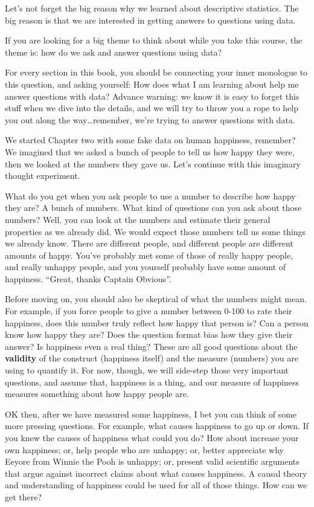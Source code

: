 \documentclass[
]{book}
\begin{document}
Let's not forget the big reason why we learned about descriptive statistics. The big reason is that we are interested in getting answers to questions using data.

If you are looking for a big theme to think about while you take this course, the theme is: how do we ask and answer questions using data?

For every section in this book, you should be connecting your inner monologue to this question, and asking yourself: How does what I am learning about help me answer questions with data? Advance warning: we know it is easy to forget this stuff when we dive into the details, and we will try to throw you a rope to help you out along the way\ldots remember, we're trying to answer questions with data.

We started Chapter two with some fake data on human happiness, remember? We imagined that we asked a bunch of people to tell us how happy they were, then we looked at the numbers they gave us. Let's continue with this imaginary thought experiment.

What do you get when you ask people to use a number to describe how happy they are? A bunch of numbers. What kind of questions can you ask about those numbers? Well, you can look at the numbers and estimate their general properties as we already did. We would expect those numbers tell us some things we already know. There are different people, and different people are different amounts of happy. You've probably met some of those of really happy people, and really unhappy people, and you yourself probably have some amount of happiness. ``Great, thanks Captain Obvious''.

Before moving on, you should also be skeptical of what the numbers might mean. For example, if you force people to give a number between 0-100 to rate their happiness, does this number truly reflect how happy that person is? Can a person know how happy they are? Does the question format bias how they give their answer? Is happiness even a real thing? These are all good questions about the \textbf{validity} of the construct (happiness itself) and the measure (numbers) you are using to quantify it. For now, though, we will side-step those very important questions, and assume that, happiness is a thing, and our measure of happiness measures something about how happy people are.

OK then, after we have measured some happiness, I bet you can think of some more pressing questions. For example, what causes happiness to go up or down. If you knew the causes of happiness what could you do? How about increase your own happiness; or, help people who are unhappy; or, better appreciate why Eeyore from Winnie the Pooh is unhappy; or, present valid scientific arguments that argue against incorrect claims about what causes happiness. A causal theory and understanding of happiness could be used for all of those things. How can we get there?
\end{document}
